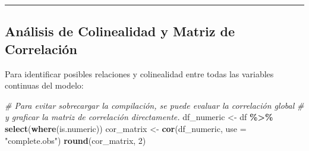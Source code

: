 \documentclass[
]{book}
\newenvironment{Shaded}{\begin{snugshade}}{\end{snugshade}}
\newcommand{\AttributeTok}[1]{\textcolor[rgb]{0.13,0.29,0.53}{#1}}
\newcommand{\CommentTok}[1]{\textcolor[rgb]{0.56,0.35,0.01}{\textit{#1}}}
\newcommand{\DecValTok}[1]{\textcolor[rgb]{0.00,0.00,0.81}{#1}}
\newcommand{\FunctionTok}[1]{\textcolor[rgb]{0.13,0.29,0.53}{\textbf{#1}}}
\newcommand{\NormalTok}[1]{#1}
\newcommand{\OtherTok}[1]{\textcolor[rgb]{0.56,0.35,0.01}{#1}}
\newcommand{\SpecialCharTok}[1]{\textcolor[rgb]{0.81,0.36,0.00}{\textbf{#1}}}
\newcommand{\StringTok}[1]{\textcolor[rgb]{0.31,0.60,0.02}{#1}}
\begin{document}
\begin{center}\rule{0.5\linewidth}{0.5pt}\end{center}

\subsection{Análisis de Colinealidad y Matriz de Correlación}\label{anuxe1lisis-de-colinealidad-y-matriz-de-correlaciuxf3n}

Para identificar posibles relaciones y colinealidad entre todas las variables continuas del modelo:

\begin{Shaded}
\begin{Highlighting}[]
\CommentTok{\# Para evitar sobrecargar la compilación, se puede evaluar la correlación global}
\CommentTok{\# y graficar la matriz de correlación directamente.}
\NormalTok{df\_numeric }\OtherTok{\textless{}{-}}\NormalTok{ df }\SpecialCharTok{\%\textgreater{}\%} \FunctionTok{select}\NormalTok{(}\FunctionTok{where}\NormalTok{(is.numeric))}
\NormalTok{cor\_matrix }\OtherTok{\textless{}{-}} \FunctionTok{cor}\NormalTok{(df\_numeric, }\AttributeTok{use =} \StringTok{"complete.obs"}\NormalTok{)}
\FunctionTok{round}\NormalTok{(cor\_matrix, }\DecValTok{2}\NormalTok{)}
\end{Highlighting}
\end{Shaded}
\end{document}
